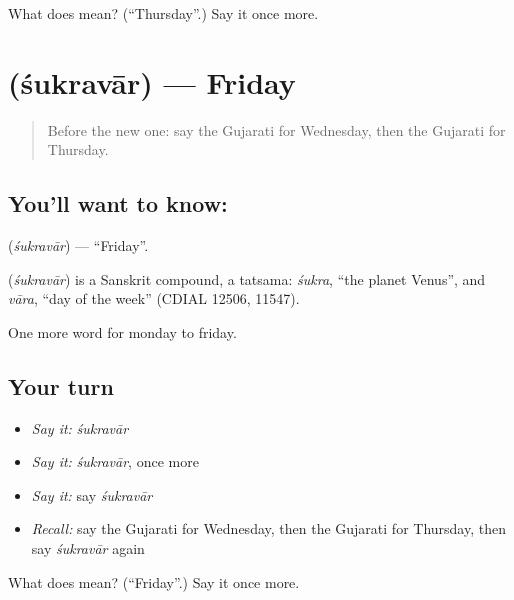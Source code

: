 \begin{tcolorbox}[breakable,colback=teal!4,colframe=teal!35!black,title={Before you move on}]
What does  mean? (\textquotedblleft{}Thursday\textquotedblright{}.) Say it once more.
\end{tcolorbox}
\section[\texorpdfstring{\gu{શુક્રવાર} (śukravār)}{શુક્રવાર (śukravār)}]{ (śukravār) — Friday}

\label{lesson:GU-C78-friday}



\begin{quote}
Before the new one: say the Gujarati for Wednesday, then the Gujarati for Thursday.
\end{quote}

\subsection*{You'll want to know: }
\textbf{} (\emph{śukravār}) — \textquotedblleft{}Friday\textquotedblright{}.

\begin{cousinweb}
\textbf{} (\emph{śukravār}) is a Sanskrit compound, a tatsama: \emph{śukra}, \textquotedblleft{}the planet Venus\textquotedblright{}, and \emph{vāra}, \textquotedblleft{}day of the week\textquotedblright{} (CDIAL 12506, 11547).
\end{cousinweb}

\begin{grammarlens}[title={What you've built}]
One more word for monday to friday.
\end{grammarlens}

\subsection*{Your turn}
\begin{itemize}
\raggedright
  \item \emph{Say it:} \emph{śukravār}
  \item \emph{Say it:} \emph{śukravār}, once more
  \item \emph{Say it:} say \emph{śukravār}
  \item \emph{Recall:} say the Gujarati for Wednesday, then the Gujarati for Thursday, then say \emph{śukravār} again
\end{itemize}

\begin{tcolorbox}[breakable,colback=teal!4,colframe=teal!35!black,title={Before you move on}]
What does  mean? (\textquotedblleft{}Friday\textquotedblright{}.) Say it once more.
\end{tcolorbox}
